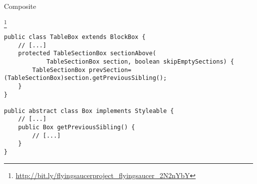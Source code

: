 \begin{pattern}{Composite}
    
\instances{}

\footnote{\url{http://bit.ly/flyingsaucerproject_flyingsaucer_2N2nYbY}}

\begin{verbatim}
public class TableBox extends BlockBox {
    // [...]
    protected TableSectionBox sectionAbove(
            TableSectionBox section, boolean skipEmptySections) {
        TableSectionBox prevSection=(TableSectionBox)section.getPreviousSibling();
    }
}

public abstract class Box implements Styleable {
    // [...]
    public Box getPreviousSibling() {
        // [...]
    }
}
\end{verbatim}

\detection{}

\discussion{}

\related{}

\end{pattern}
